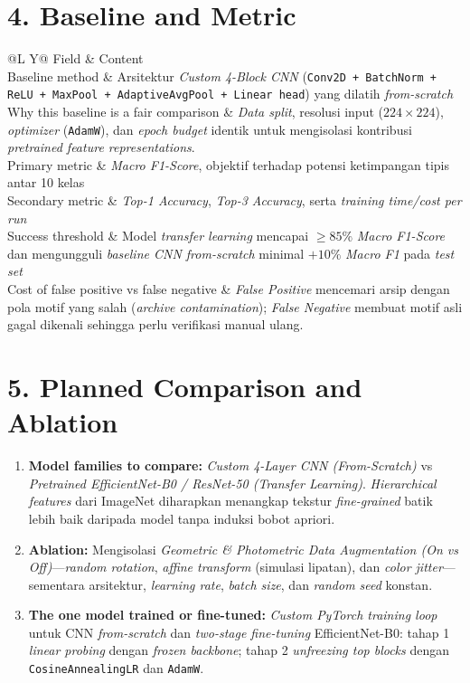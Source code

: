 \documentclass[9pt,a4paper]{extarticle}
\makeatletter
\renewcommand{\arraystretch}{1.12}
\newcommand{\proposalTable}[1]{%
    \renewcommand{\arraystretch}{1.14}%
    \begin{tabularx}{\textwidth}{@{}L Y@{}}
    \toprule[0.7pt]
    \textcolor{muted}{Field} & \textcolor{muted}{Content}\\
    \midrule
    #1
    \bottomrule[0.7pt]
    \end{tabularx}%
}
\makeatother
\begin{document}
\section*{4. Baseline and Metric}
\proposalTable{%
    Baseline method & Arsitektur \textit{Custom 4-Block CNN} (\texttt{Conv2D + BatchNorm + ReLU + MaxPool + AdaptiveAvgPool + Linear head}) yang dilatih \textit{from-scratch}\\
    Why this baseline is a fair comparison & \textit{Data split}, resolusi input ($224\times224$), \textit{optimizer} (\texttt{AdamW}), dan \textit{epoch budget} identik untuk mengisolasi kontribusi \textit{pretrained feature representations}.\\
    Primary metric & \textit{Macro F1-Score}, objektif terhadap potensi ketimpangan tipis antar 10 kelas\\
    Secondary metric & \textit{Top-1 Accuracy}, \textit{Top-3 Accuracy}, serta \textit{training time/cost per run}\\
    Success threshold & Model \textit{transfer learning} mencapai $\ge 85\%$ \textit{Macro F1-Score} dan mengungguli \textit{baseline CNN from-scratch} minimal $+10\%$ \textit{Macro F1} pada \textit{test set}\\
    Cost of false positive vs false negative & \textit{False Positive} mencemari arsip dengan pola motif yang salah (\textit{archive contamination}); \textit{False Negative} membuat motif asli gagal dikenali sehingga perlu verifikasi manual ulang.\\
}

\section*{5. Planned Comparison and Ablation}
\begin{enumerate}
    \item \textbf{Model families to compare:} \textit{Custom 4-Layer CNN (From-Scratch)} vs \textit{Pretrained EfficientNet-B0 / ResNet-50 (Transfer Learning)}. \textit{Hierarchical features} dari ImageNet diharapkan menangkap tekstur \textit{fine-grained} batik lebih baik daripada model tanpa induksi bobot apriori.
    \item \textbf{Ablation:} Mengisolasi \textit{Geometric \& Photometric Data Augmentation (On vs Off)}---\textit{random rotation}, \textit{affine transform} (simulasi lipatan), dan \textit{color jitter}---sementara arsitektur, \textit{learning rate}, \textit{batch size}, dan \textit{random seed} konstan.
    \item \textbf{The one model trained or fine-tuned:} \textit{Custom PyTorch training loop} untuk CNN \textit{from-scratch} dan \textit{two-stage fine-tuning} EfficientNet-B0: tahap 1 \textit{linear probing} dengan \textit{frozen backbone}; tahap 2 \textit{unfreezing top blocks} dengan \texttt{CosineAnnealingLR} dan \texttt{AdamW}.
\end{enumerate}
\end{document}
